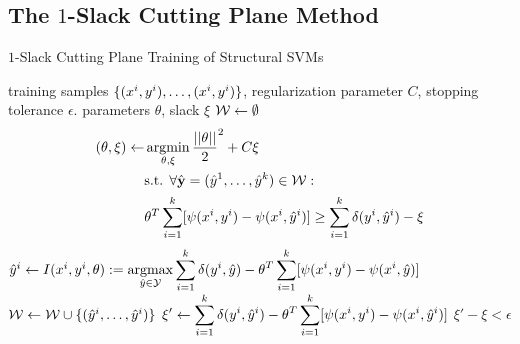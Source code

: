 \subsection{The $1$-Slack Cutting Plane Method}

\begin{algorithm*}[t]
    \caption{$1$-Slack Cutting Plane Training of Structural SVMs \label{alg_one_slack}}
    \begin{algorithmic}[1]
        \Require training samples $\{ (x^{i}, y^{i}), \dots, (x^{i}, y^{i})\}$, regularization parameter $C$, stopping tolerance $\epsilon$.
        \Ensure parameters $\theta$, slack $\xi$
        \State $\mathcal{W} \leftarrow \emptyset$
        \Repeat
            \State 
            \vspace{-5mm}
            \begin{align*}
            (\theta, \xi) \leftarrow \displaystyle &\operatorname*{argmin}_{\theta, \xi} \frac{||\theta||}{2}^2 + C \xi\\
            &\text{s.t. }\forall \hat{\mathbf{y}}=(\hat{y}^{1}, \dots, \hat{y}^{k}) \in \mathcal{W}:\\
            &\theta^T \sum_{i=1}^k [\psi(x^{i}, y^{i}) - \psi(x^{i}, \hat{y}^{i})] \geq \sum_{i=1}^k \delta(y^{i}, \hat{y}^{i}) - \xi
            \end{align*}
                \State
                $\hat{y}^{i} \leftarrow I(x^{i}, y^{i}, \theta) := \displaystyle \operatorname*{argmax}_{\hat{y}\in\mathcal{Y}} \sum_{i=1}^k \delta(y^{i}, \hat{y}) - \theta^T \sum_{i=1}^k [\psi(x^{i}, y^{i}) - \psi(x^{i}, \hat{y})]$ \label{get_cutting_plane}
            \EndFor
            \State $\mathcal{W} \leftarrow \mathcal{W} \cup \{ (\hat{y}^{i}, \dots, \hat{y}^{i}) \} $
            \State $ \displaystyle \xi' \leftarrow  \sum_{i=1}^k \delta(y^{i}, \hat{y}^{i}) - \theta^T \sum_{i=1}^k [\psi(x^{i}, y^{i}) - \psi(x^{i}, \hat{y}^{i})] $
        \Until $\xi' - \xi < \epsilon$ \label{convergence_check}
    \end{algorithmic}
\end{algorithm*}

